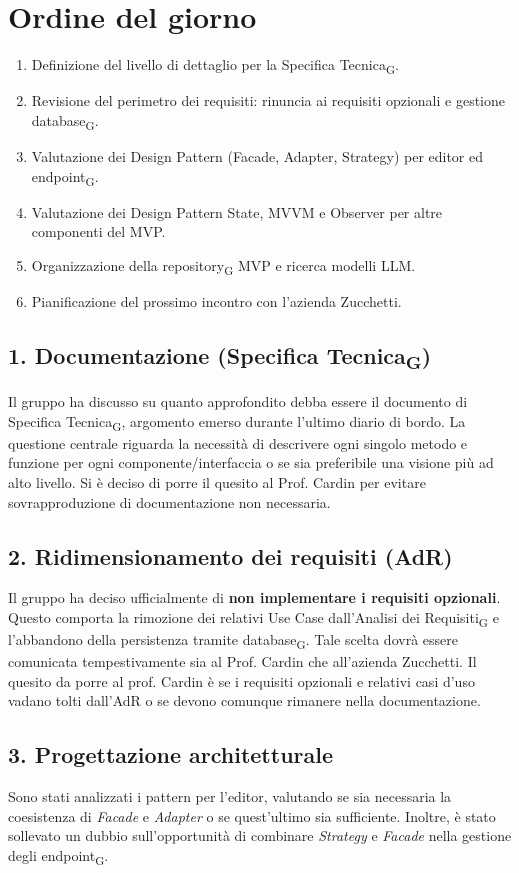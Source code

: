 \documentclass[a4paper,12pt]{article}
\newcommand{\gls}[1]{#1\textsubscript{G}}
\begin{document}
\section*{Ordine del giorno}
\begin{enumerate}
    \item Definizione del livello di dettaglio per la \gls{Specifica Tecnica}.
    \item Revisione del perimetro dei requisiti: rinuncia ai requisiti opzionali e gestione \gls{database}.
    \item Valutazione dei Design Pattern (Facade, Adapter, Strategy) per editor ed \gls{endpoint}.
    \item Valutazione dei Design Pattern State, MVVM e Observer per altre componenti del MVP.
    \item Organizzazione della \gls{repository} MVP e ricerca modelli LLM.
    \item Pianificazione del prossimo incontro con l'azienda Zucchetti.
\end{enumerate}

\subsection*{1. Documentazione (\gls{Specifica Tecnica})}
Il gruppo ha discusso su quanto approfondito debba essere il documento di \gls{Specifica Tecnica}, argomento emerso durante l'ultimo diario di bordo. La questione centrale riguarda la necessità di descrivere ogni singolo metodo e funzione per ogni componente/interfaccia o se sia preferibile una visione più ad alto livello. Si è deciso di porre il quesito al Prof. Cardin per evitare sovrapproduzione di documentazione non necessaria.

\subsection*{2. Ridimensionamento dei requisiti (AdR)}
Il gruppo ha deciso ufficialmente di \textbf{non implementare i requisiti opzionali}. Questo comporta la rimozione dei relativi Use Case dall'\gls{Analisi dei Requisiti} e l'abbandono della persistenza tramite \gls{database}. Tale scelta dovrà essere comunicata tempestivamente sia al Prof. Cardin che all'azienda Zucchetti. Il quesito da porre al prof. Cardin è se i requisiti opzionali e relativi casi d'uso vadano tolti dall'AdR o se devono comunque rimanere nella documentazione.

\subsection*{3. Progettazione architetturale}
Sono stati analizzati i pattern per l'editor, valutando se sia necessaria la coesistenza di \textit{Facade} e \textit{Adapter} o se quest'ultimo sia sufficiente. Inoltre, è stato sollevato un dubbio sull'opportunità di combinare \textit{Strategy} e \textit{Facade} nella gestione degli \gls{endpoint}.
\end{document}
